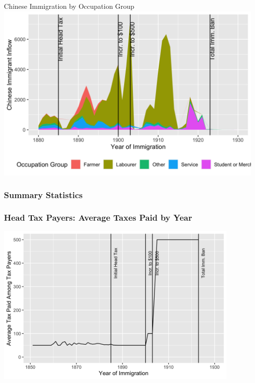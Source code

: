 \documentclass[pdf]{beamer}
\begin{document}
\begin{frame}{Chinese Immigration by Occupation Group}
    \includegraphics[width = \textwidth]{../../figs/chiocc.png}
\end{frame}

\appendix
\begin{frame}[label = summstats]
	\frametitle{Summary Statistics}
	\begin{table}[H]
        \centering 
		\resizebox{\textwidth}{!}{
            
		}
	\end{table}  
\end{frame}

\begin{frame}[label=taxespaid]
    \frametitle{Head Tax Payers: Average Taxes Paid by Year}
    \centering
    \includegraphics[width = 0.9\textwidth]{../../figs/taxespaid.png}
    \hyperlink{yrimmchi}{}
\end{frame}
\end{document}
